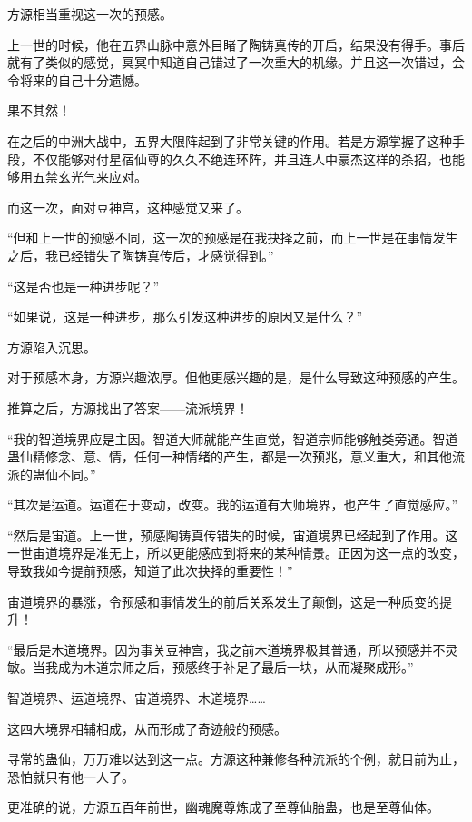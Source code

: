 
\begin{this_body}

方源相当重视这一次的预感。

上一世的时候，他在五界山脉中意外目睹了陶铸真传的开启，结果没有得手。事后就有了类似的感觉，冥冥中知道自己错过了一次重大的机缘。并且这一次错过，会令将来的自己十分遗憾。

果不其然！

在之后的中洲大战中，五界大限阵起到了非常关键的作用。若是方源掌握了这种手段，不仅能够对付星宿仙尊的久久不绝连环阵，并且连人中豪杰这样的杀招，也能够用五禁玄光气来应对。

而这一次，面对豆神宫，这种感觉又来了。

“但和上一世的预感不同，这一次的预感是在我抉择之前，而上一世是在事情发生之后，我已经错失了陶铸真传后，才感觉得到。”

“这是否也是一种进步呢？”

“如果说，这是一种进步，那么引发这种进步的原因又是什么？”

方源陷入沉思。

对于预感本身，方源兴趣浓厚。但他更感兴趣的是，是什么导致这种预感的产生。

推算之后，方源找出了答案——流派境界！

“我的智道境界应是主因。智道大师就能产生直觉，智道宗师能够触类旁通。智道蛊仙精修念、意、情，任何一种情绪的产生，都是一次预兆，意义重大，和其他流派的蛊仙不同。”

“其次是运道。运道在于变动，改变。我的运道有大师境界，也产生了直觉感应。”

“然后是宙道。上一世，预感陶铸真传错失的时候，宙道境界已经起到了作用。这一世宙道境界是准无上，所以更能感应到将来的某种情景。正因为这一点的改变，导致我如今提前预感，知道了此次抉择的重要性！”

宙道境界的暴涨，令预感和事情发生的前后关系发生了颠倒，这是一种质变的提升！

“最后是木道境界。因为事关豆神宫，我之前木道境界极其普通，所以预感并不灵敏。当我成为木道宗师之后，预感终于补足了最后一块，从而凝聚成形。”

智道境界、运道境界、宙道境界、木道境界……

这四大境界相辅相成，从而形成了奇迹般的预感。

寻常的蛊仙，万万难以达到这一点。方源这种兼修各种流派的个例，就目前为止，恐怕就只有他一人了。

更准确的说，方源五百年前世，幽魂魔尊炼成了至尊仙胎蛊，也是至尊仙体。


\end{this_body}
